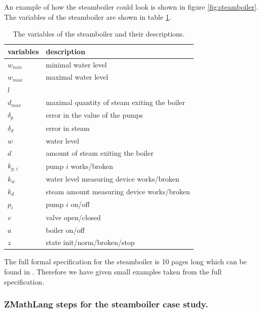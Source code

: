 An example of how the steamboiler could look is shown in figure
\ref{fig:steamboiler}. The variables of the steamboiler are shown in table
\ref{tab:steamboilervariables}.

\begin{table}[H]
\begin{tabular}{l|l}
\textbf{variables} & \textbf{description} \\
\hline
$w_{min}$ & minimal water level \\
$w_{max}$ & maximal water level \\
$l$ & \\
$d_{max}$ & maximal quantity of steam exiting the boiler \\
$\delta_{p}$ & error in the value of the pumps \\
$\delta_{d}$ & error in steam\\
$w$ & water level \\
$d$ &  amount of steam exiting the boiler \\
$k_{p,i}$ & pump $i$ works/broken \\
$k_{w}$ & water level measuring device works/broken \\
$k_{d}$ & steam amount measuring device works/broken\\
$p_{i}$ & pump $i$ on/off \\
$v$ & valve open/closed \\
$a$ & boiler on/off \\
$z$ & state init/norm/broken/stop 
\end{tabular}
\caption{The variables of the steamboiler and their descriptions. \label{tab:steamboilervariables}}
\end{table}

The full formal specification for the steamboiler is 10 pages long which can be
found in \cite{mathlangexamples}. Therefore we have given small examples taken
from the full specification.

\subsubsection{ZMathLang steps for the steamboiler case study.}

